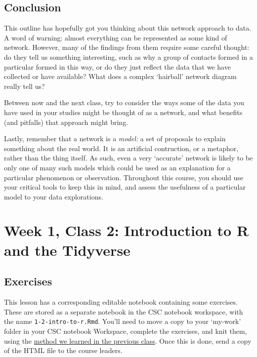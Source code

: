 \documentclass[
]{book}
\begin{document}
\hypertarget{conclusion}{%
\section{Conclusion}\label{conclusion}}

This outline has hopefully got you thinking about this network approach to data. A word of warning: almost everything can be represented as some kind of network. However, many of the findings from them require some careful thought: do they tell us something interesting, such as why a group of contacts formed in a particular formed in this way, or do they just reflect the data that we have collected or have available? What does a complex `hairball' network diagram really tell us?

Between now and the next class, try to consider the ways some of the data you have used in your studies might be thought of as a network, and what benefits (and pitfalls) that approach might bring.

Lastly, remember that a network is a \emph{model:} a set of proposals to explain something about the real world. It is an artificial contruction, or a metaphor, rather than the thing itself. As such, even a very `accurate' network is likely to be only one of many such models which could be used as an explanation for a particular phenomenon or observation. Throughout this course, you should use your critical tools to keep this in mind, and assess the usefulness of a particular model to your data explorations.

\hypertarget{week-1-class-2-introduction-to-r-and-the-tidyverse}{%
\chapter{Week 1, Class 2: Introduction to R and the Tidyverse}\label{week-1-class-2-introduction-to-r-and-the-tidyverse}}

\hypertarget{exercises}{%
\section{Exercises}\label{exercises}}

This lesson has a corresponding editable notebook containing some exercises. These are stored as a separate notebook in the CSC notebook workspace, with the name \texttt{1-2-intro-to-r.Rmd}. You'll need to move a copy to your `my-work' folder in your CSC notebook Workspace, complete the exercises, and knit them, using the \href{https://comhis.github.io/applying-network-analysis-to-humanities/notebooks/1-1-introduction_nb.html}{method we learned in the previous class}. Once this is done, send a copy of the HTML file to the course leaders.
\end{document}

